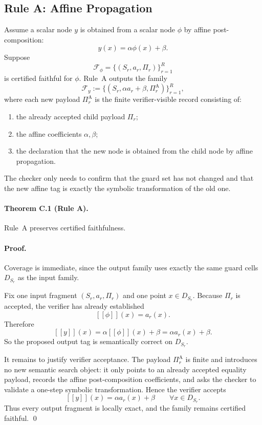 \subsection{Rule A: Affine Propagation}

Assume a scalar node $y$ is obtained from a scalar node $\phi$ by affine post-composition:
\[
 y(x)=\alpha\phi(x)+\beta.
\]
Suppose
\[
 \mathcal F_\phi=\{(S_r,a_r,\Pi_r)\}_{r=1}^{R}
\]
is certified faithful for $\phi$. Rule~A outputs the family
\[
 \mathcal F_y:=\{(S_r,\alpha a_r+\beta,\Pi_r^{\mathrm A})\}_{r=1}^{R},
\]
where each new payload $\Pi_r^{\mathrm A}$ is the finite verifier-visible record consisting of:
\begin{enumerate}
    \item the already accepted child payload $\Pi_r$;
    \item the affine coefficients $\alpha,\beta$;
    \item the declaration that the new node is obtained from the child node by affine propagation.
\end{enumerate}
The checker only needs to confirm that the guard set has not changed and that the new affine tag is exactly the symbolic transformation of the old one.

\paragraph{Theorem C.1 (Rule A).}
Rule~A preserves certified faithfulness.

\paragraph{Proof.}
Coverage is immediate, since the output family uses exactly the same guard cells $D_{S_r}$ as the input family.

Fix one input fragment $(S_r,a_r,\Pi_r)$ and one point $x\in D_{S_r}$. Because $\Pi_r$ is accepted, the verifier has already established
\[
 [[\phi]](x)=a_r(x).
\]
Therefore
\[
 [[y]](x)=\alpha[[\phi]](x)+\beta=\alpha a_r(x)+\beta.
\]
So the proposed output tag is semantically correct on $D_{S_r}$.

It remains to justify verifier acceptance. The payload $\Pi_r^{\mathrm A}$ is finite and introduces no new semantic search object: it only points to an already accepted equality payload, records the affine post-composition coefficients, and asks the checker to validate a one-step symbolic transformation. Hence the verifier accepts
\[
 [[y]](x)=\alpha a_r(x)+\beta
 \qquad \forall x\in D_{S_r}.
\]
Thus every output fragment is locally exact, and the family remains certified faithful. \qed

